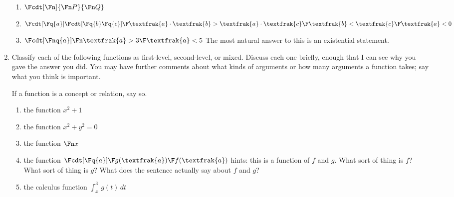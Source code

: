 \documentclass[12pt]{article}
\begin{document}
\begin{enumerate}
\begin{enumerate}

\item  $\Fcdt[\Fn]{\Fn P}{\Fn Q}$

\item  $\Fcdt[\Fq{a}]{\Fcdt[\Fq{b}\Fq{c}]{\F \textfrak{a}\cdot \textfrak {b} > \textfrak{a} \cdot \textfrak{c}}{\F \textfrak{b} < \textfrak{c}}}{\F \textfrak{a} < 0}$

\item $\Fcdt[\Fnq{a}]{\Fn \textfrak{a} > 3}{\F \textfrak{a} <5}$  The most natural answer to this is an existential statement.

\end{enumerate}

\item  Classify each of the following functions as first-level, second-level, or mixed.  Discuss each one briefly, enough that I can see why you gave the answer you did.
You may have further comments about what kinds of arguments or how many arguments a function takes;  say what you think is important.

If a function is a concept or relation, say so.

\begin{enumerate}

\item the function $x^2+1$

\item the function $x^2+y^2=0$

\item the function $\Fn x$

\item the function $\Fcdt[\Fq{a}]{\F g(\textfrak{a})}{\F f(\textfrak{a})}$  hints:  this is a function of $f$ and $g$.  What sort of thing is $f$?  What sort of thing is $g$?
What does the sentence actually say about $f$ and $g$?

\item the calculus function $\int_x^3\,g(t)\,dt$

\end{enumerate}

\end{enumerate}
\end{document}
